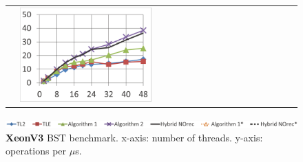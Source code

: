 \begin{figure}
\begin{minipage}{1\linewidth}
\begin{tabular}{m{0.03\linewidth}m{0.485\linewidth}m{0.485\linewidth}}
        \vspace{-8mm}\includegraphics[width=\linewidth]{figures/graphs/20i20d100000k-nrq0.png} &
        \vspace{-8mm}\includegraphics[width=\linewidth]{figures/graphs/20i20d100000k-nrq1.png}
        \\
    \end{tabular}
\end{minipage}
    \vspace{-2mm}
	\includegraphics[width=\linewidth]{figures/graphs/power8/dsbench3_legend_power.png}
    \vspace{-2mm}
\caption{\textbf{XeonV3} BST benchmark. x-axis: number of threads. y-axis: operations per $\mu$s.}
\label{fig-exp-xeonv3}
\end{figure}



